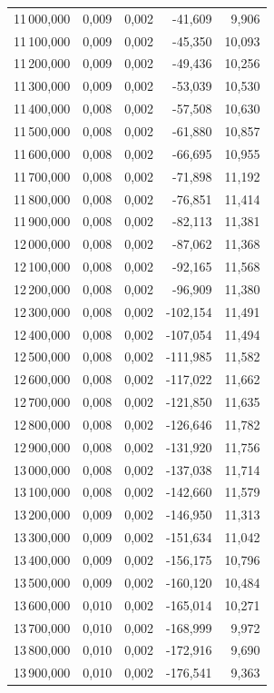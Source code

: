 \begin{longtable}{rrrrr}
11\,000,000 & 0,009 & 0,002 & -41,609 & 9,906\\
11\,100,000 & 0,009 & 0,002 & -45,350 & 10,093\\
11\,200,000 & 0,009 & 0,002 & -49,436 & 10,256\\
11\,300,000 & 0,009 & 0,002 & -53,039 & 10,530\\
11\,400,000 & 0,008 & 0,002 & -57,508 & 10,630\\
11\,500,000 & 0,008 & 0,002 & -61,880 & 10,857\\
11\,600,000 & 0,008 & 0,002 & -66,695 & 10,955\\
11\,700,000 & 0,008 & 0,002 & -71,898 & 11,192\\
11\,800,000 & 0,008 & 0,002 & -76,851 & 11,414\\
11\,900,000 & 0,008 & 0,002 & -82,113 & 11,381\\
12\,000,000 & 0,008 & 0,002 & -87,062 & 11,368\\
12\,100,000 & 0,008 & 0,002 & -92,165 & 11,568\\
12\,200,000 & 0,008 & 0,002 & -96,909 & 11,380\\
12\,300,000 & 0,008 & 0,002 & -102,154 & 11,491\\
12\,400,000 & 0,008 & 0,002 & -107,054 & 11,494\\
12\,500,000 & 0,008 & 0,002 & -111,985 & 11,582\\
12\,600,000 & 0,008 & 0,002 & -117,022 & 11,662\\
12\,700,000 & 0,008 & 0,002 & -121,850 & 11,635\\
12\,800,000 & 0,008 & 0,002 & -126,646 & 11,782\\
12\,900,000 & 0,008 & 0,002 & -131,920 & 11,756\\
13\,000,000 & 0,008 & 0,002 & -137,038 & 11,714\\
13\,100,000 & 0,008 & 0,002 & -142,660 & 11,579\\
13\,200,000 & 0,009 & 0,002 & -146,950 & 11,313\\
13\,300,000 & 0,009 & 0,002 & -151,634 & 11,042\\
13\,400,000 & 0,009 & 0,002 & -156,175 & 10,796\\
13\,500,000 & 0,009 & 0,002 & -160,120 & 10,484\\
13\,600,000 & 0,010 & 0,002 & -165,014 & 10,271\\
13\,700,000 & 0,010 & 0,002 & -168,999 & 9,972\\
13\,800,000 & 0,010 & 0,002 & -172,916 & 9,690\\
13\,900,000 & 0,010 & 0,002 & -176,541 & 9,363\\

\end{longtable}

